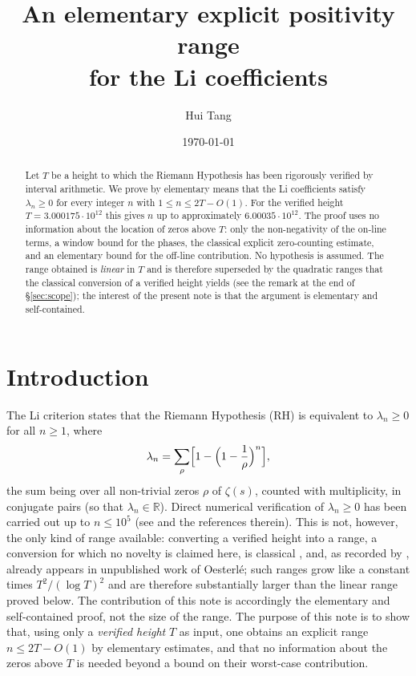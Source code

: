 \documentclass[11pt]{article}
\title{\bfseries An elementary explicit positivity range\\ for the Li coefficients}
\author{Hui Tang}
\date{\today}
\theoremstyle{remark}
\newcommand{\R}{\mathbb{R}}
\begin{document}
\maketitle

\begin{abstract}
Let $T$ be a height to which the Riemann Hypothesis has been rigorously verified by interval
arithmetic. We prove by elementary means that the Li coefficients satisfy
$\lambda_n\ge 0$ for every integer $n$ with $1\le n\le 2T-O(1)$.
For the verified height $T=3.000175\cdot 10^{12}$ this gives $n$ up to approximately
$6.00035\cdot 10^{12}$. The proof uses no information about the location of zeros above $T$:
only the non-negativity of the on-line terms, a window bound for the phases, the classical
explicit zero-counting estimate, and an elementary bound for the off-line contribution. No
hypothesis is assumed. The range obtained is \emph{linear} in $T$ and is therefore superseded
by the quadratic ranges that the classical conversion of a verified height yields (see the
remark at the end of \S\ref{sec:scope}); the interest of the present note is that the
argument is elementary and self-contained.
\end{abstract}

\section{Introduction}
The Li criterion \cite{Li} states that the Riemann Hypothesis (RH) is equivalent to
$\lambda_n\ge0$ for all $n\ge1$, where
\begin{equation}\label{eq:li}
  \lambda_n=\sum_{\rho}\Bigl[1-\Bigl(1-\frac1\rho\Bigr)^{n}\Bigr],
\end{equation}
the sum being over all non-trivial zeros $\rho$ of $\zeta(s)$, counted with multiplicity, in
conjugate pairs (so that $\lambda_n\in\R$). Direct numerical verification of
$\lambda_n\ge0$ has been carried out up to $n\le10^{5}$ (see \cite{Keiper,Coffey} and the
references therein). This is not, however, the only kind of range available: converting a
verified height into a range, a conversion for which no novelty is claimed here, is classical
\cite{BombieriLagarias}, and, as recorded by \cite{Voros}, already appears in unpublished work
of Oesterl\'e; such ranges grow like a constant times $T^{2}/(\log T)^{2}$ and are therefore
substantially larger than the linear range proved below. The contribution of this note is
accordingly the elementary and self-contained proof, not the size of the range. The purpose of this note is to show that, using only a \emph{verified
height} $T$ as input, one obtains an explicit range $n\le 2T-O(1)$ by elementary estimates, and
that no information about the zeros above $T$ is needed beyond a bound on their worst-case
contribution.
\end{document}
